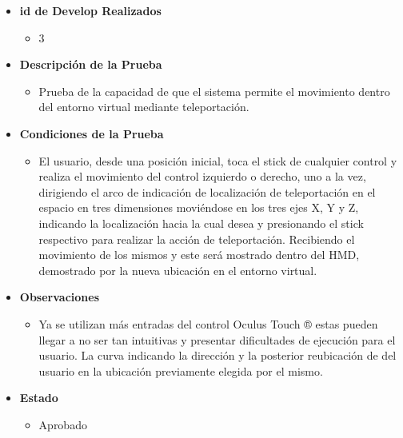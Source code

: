 \begin{itemize}
\begin{figure}[H]
\begin{center}
       	\end{center} 
    \end{figure}
\end{itemize}

\begin{itemize}
    \item \textbf{id de Develop Realizados}
    \begin{itemize}
        \item 3
    \end{itemize}
    \item \textbf{Descripción de la Prueba}
    \begin{itemize}
        \item Prueba de la capacidad de que el sistema permite el movimiento dentro del entorno virtual mediante teleportación.
    \end{itemize}
    \item \textbf{Condiciones de la Prueba}
    \begin{itemize}
        \item 
        El usuario, desde una posición inicial, toca el stick de cualquier control y realiza el movimiento del control izquierdo o derecho, uno a la vez, dirigiendo el arco de indicación de localización de teleportación en el espacio en tres dimensiones moviéndose en los tres ejes X, Y y Z, indicando la localización hacia la cual desea y presionando el stick respectivo para realizar la acción de teleportación. Recibiendo el movimiento de los mismos y este será mostrado dentro del HMD, demostrado por la nueva ubicación en el entorno virtual.\\        
    \end{itemize}
    \item \textbf{Observaciones}
    \begin{itemize}
        \item Ya se utilizan más entradas del control Oculus Touch ® estas pueden llegar a no ser tan intuitivas y presentar dificultades de ejecución para el usuario. La curva indicando la dirección y la posterior reubicación de del usuario en la ubicación previamente elegida por el mismo.
    \end{itemize}
    \item \textbf{Estado}
    \begin{itemize}
        \item Aprobado

\end{itemize}
\end{itemize}
